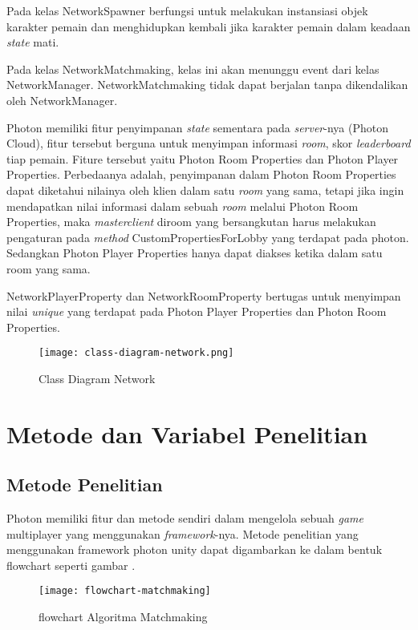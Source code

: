 Pada kelas NetworkSpawner berfungsi untuk melakukan instansiasi objek karakter pemain dan menghidupkan kembali jika karakter pemain dalam keadaan \textit{state} mati.

Pada kelas NetworkMatchmaking, kelas ini akan menunggu event dari kelas NetworkManager. NetworkMatchmaking tidak dapat berjalan tanpa dikendalikan oleh NetworkManager.

Photon memiliki fitur penyimpanan \textit{state} sementara pada \textit{server}-nya (Photon Cloud), fitur tersebut berguna untuk menyimpan informasi \textit{room}, skor \textit{leaderboard} tiap pemain.
Fiture tersebut yaitu Photon Room Properties dan Photon Player Properties.
Perbedaanya adalah, penyimpanan dalam Photon Room Properties dapat diketahui nilainya oleh klien dalam satu \textit{room} yang sama, tetapi jika ingin mendapatkan nilai informasi dalam sebuah \textit{room} melalui Photon Room Properties, maka \textit{masterclient} diroom yang bersangkutan harus melakukan pengaturan pada \textit{method} CustomPropertiesForLobby yang terdapat pada photon.
Sedangkan Photon Player Properties hanya dapat diakses ketika dalam satu room yang sama.

NetworkPlayerProperty dan NetworkRoomProperty bertugas untuk menyimpan nilai \textit{unique} yang terdapat pada Photon Player Properties dan Photon Room Properties.

\begin{figure}[h]
    \centering
    \texttt{[image: class-diagram-network.png]}
    \caption{Class Diagram Network}
    \label{fig:class-network}
\end{figure}

\section{Metode dan Variabel Penelitian}
\subsection{Metode Penelitian}
Photon memiliki fitur dan metode sendiri dalam mengelola sebuah \textit{game} multiplayer yang menggunakan \textit{framework}-nya. Metode penelitian yang menggunakan framework photon unity dapat digambarkan ke dalam bentuk flowchart seperti gambar .
        \begin{figure}[h]
         \centering
         \caption{flowchart Algoritma Matchmaking}
         \texttt{[image: flowchart-matchmaking]}
         \label{fig:algoritmamatmaching}
         \end{figure}

